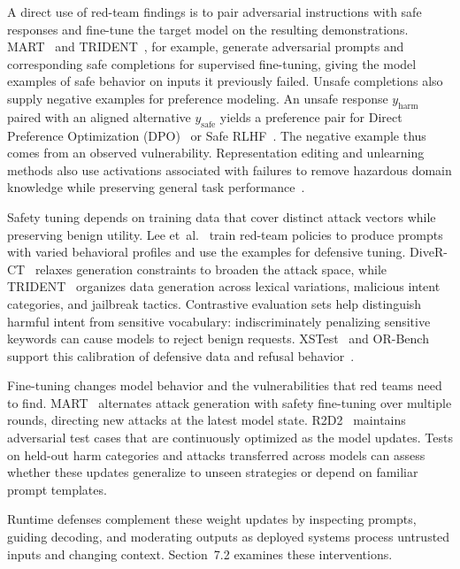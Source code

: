 \documentclass[review]{fcs}
\let\fcsOriginalCite\cite
\renewcommand{\cite}[1]{\allowbreak\fcsOriginalCite{#1}}
\begin{document}
A direct use of red-team findings is to pair adversarial instructions with safe responses and fine-tune the target model on the resulting demonstrations. MART~\cite{ge2024mart} and TRIDENT~\cite{wu2025trident}, for example, generate adversarial prompts and corresponding safe completions for supervised fine-tuning, giving the model examples of safe behavior on inputs it previously failed. Unsafe completions also supply negative examples for preference modeling. An unsafe response $y_{\text{harm}}$ paired with an aligned alternative $y_{\text{safe}}$ yields a preference pair for Direct Preference Optimization (DPO)~\cite{rafailov2023directpreference} or Safe RLHF~\cite{dai2024saferlhf,ji2023beavertails}. The negative example thus comes from an observed vulnerability. Representation editing and unlearning methods also use activations associated with failures to remove hazardous domain knowledge while preserving general task performance~\cite{yao2024unlearning}.

Safety tuning depends on training data that cover distinct attack vectors while preserving benign utility. Lee et~al.~\cite{lee2025diverseattacks} train red-team policies to produce prompts with varied behavioral profiles and use the examples for defensive tuning. DiveR-CT~\cite{zhao2025diverct} relaxes generation constraints to broaden the attack space, while TRIDENT~\cite{wu2025trident} organizes data generation across lexical variations, malicious intent categories, and jailbreak tactics. Contrastive evaluation sets help distinguish harmful intent from sensitive vocabulary: indiscriminately penalizing sensitive keywords can cause models to reject benign requests. XSTest~\cite{rottger2024xstest} and OR-Bench~\cite{cui2025orbench} support this calibration of defensive data and refusal behavior~\cite{pan2025overrefusal}.

Fine-tuning changes model behavior and the vulnerabilities that red teams need to find. MART~\cite{ge2024mart} alternates attack generation with safety fine-tuning over multiple rounds, directing new attacks at the latest model state. R2D2~\cite{mazeika2024harmbench} maintains adversarial test cases that are continuously optimized as the model updates. Tests on held-out harm categories and attacks transferred across models can assess whether these updates generalize to unseen strategies or depend on familiar prompt templates.

Runtime defenses complement these weight updates by inspecting prompts, guiding decoding, and moderating outputs as deployed systems process untrusted inputs and changing context. Section~7.2 examines these interventions.
\end{document}
